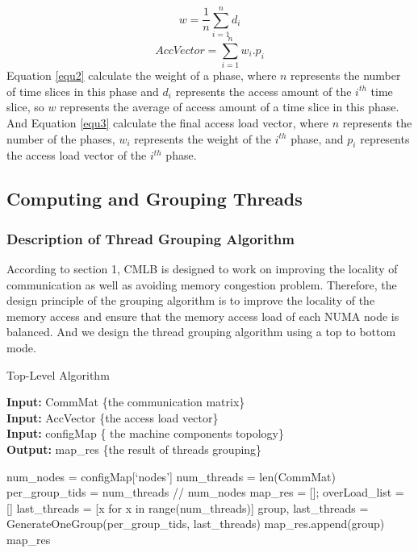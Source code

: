 \documentclass[a4paper,fleqn]{cas-sc}
\begin{document}
\begin{equation} \label{equ2}
	w = \frac{1}{n} \sum_{i=1}^{n}d_i
\end{equation}
\begin{equation} \label{equ3}
	AccVector =\sum_{i=1}^{n}w_i . p_i
\end{equation}Equation \ref{equ2} calculate the weight of a phase, where $n$ represents the number of time slices in this phase and $d_i$ represents the access amount of the $i^{th}$ time slice, so $w$ represents the average of access amount of a time slice in this phase. And Equation \ref{equ3} calculate the final access load vector, where $n$ represents the number of the phases, $w_i$  represents the weight of the $i^{th}$ phase, and $p_i$ represents the access load vector of the $i^{th}$ phase.

\subsection{Computing and Grouping Threads}
\subsubsection{Description of Thread Grouping Algorithm}
According to section 1, CMLB is designed to work on improving the locality of communication as well as avoiding memory congestion problem. Therefore, the design principle of the grouping algorithm is to improve the locality of the memory access and ensure that the memory access load of each NUMA node is balanced. And we design the thread grouping algorithm using a top to bottom mode.

\begin{algorithm}
\caption{Top-Level Algorithm}  \label{alg2}%
\hspace*{0.02in} {\bf Input:} CommMat \{the communication matrix\} \\
\hspace*{0.02in} {\bf Input:} AccVector \{the access load vector\} \\
\hspace*{0.02in} {\bf Input:} configMap \{ the machine components topology\} \\ 
\hspace*{0.02in} {\bf Output:} %
map\_res \{the result of threads grouping\}
\begin{algorithmic}[1]
\State num\_nodes = configMap[‘nodes’]
\State num\_threads = len(CommMat)
\State per\_group\_tids = num\_threads // num\_nodes
\State map\_res = []; overLoad\_list = []
\State last\_threads = [x for x in range(num\_threads)]
\State group, last\_threads = GenerateOneGroup(per\_group\_tids, last\_threads) 
\State map\_res.append(group)
\EndFor
\State \Return map\_res
\end{algorithmic}
\end{algorithm}
\end{document}
